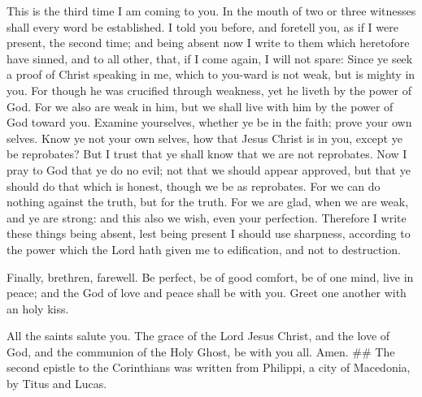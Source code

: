  This is the third time I am coming to you. In the mouth of
two or three witnesses shall every word be established.  I
told you before, and foretell you, as if I were present, the second
time; and being absent now I write to them which heretofore have sinned,
and to all other, that, if I come again, I will not spare: 
Since ye seek a proof of Christ speaking in me, which to you-ward is not
weak, but is mighty in you.  For though he was crucified
through weakness, yet he liveth by the power of God. For we also are
weak in him, but we shall live with him by the power of God toward you.
 Examine yourselves, whether ye be in the faith; prove your
own selves. Know ye not your own selves, how that Jesus Christ is in
you, except ye be reprobates?  But I trust that ye shall
know that we are not reprobates.  Now I pray to God that ye
do no evil; not that we should appear approved, but that ye should do
that which is honest, though we be as reprobates.  For we
can do nothing against the truth, but for the truth.  For we
are glad, when we are weak, and ye are strong: and this also we wish,
even your perfection.  Therefore I write these things being
absent, lest being present I should use sharpness, according to the
power which the Lord hath given me to edification, and not to
destruction.

 Finally, brethren, farewell. Be perfect, be of good
comfort, be of one mind, live in peace; and the God of love and peace
shall be with you.  Greet one another with an holy kiss.

 All the saints salute you.  The grace of the
Lord Jesus Christ, and the love of God, and the communion of the Holy
Ghost, be with you all. Amen. \#\# The second epistle to the Corinthians
was written from Philippi, a city of Macedonia, by Titus and Lucas.
